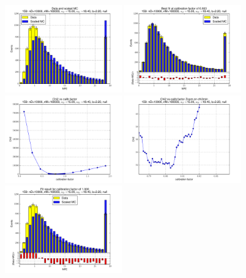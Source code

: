 
 \begin{figure}[htbp] \begin{center} 
\includegraphics[width=0.45\textwidth]{../FIGURES/159/FIG_Data_and_scaled_MC.pdf} 
\includegraphics[width=0.45\textwidth]{../FIGURES/159/FIG_Best_fit_at_calibration_factor_of_0_803.pdf} 
\includegraphics[width=0.45\textwidth]{../FIGURES/159/FIG_Chi2_vs_calib_factor.pdf} 
\includegraphics[width=0.45\textwidth]{../FIGURES/159/FIG_Chi2_vs_calib_factor_Zoom_on_chi2min.pdf} 
\includegraphics[width=0.45\textwidth]{../FIGURES/159/FIG_Fit_result_for_calibration_factor_of_1_000.pdf} 

\end{center}
\end{figure}
